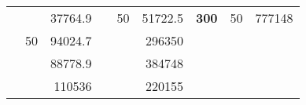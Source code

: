 \begin{table}[H]
\begin{tabular}{|ccrccrccc}
\rowcolor[HTML]{DDFDFF} 
\multicolumn{1}{|c|}{\cellcolor[HTML]{FFFFC7}}                                & \multicolumn{1}{c|}{\cellcolor[HTML]{DDFDFF}}                      & \multicolumn{1}{r|}{\cellcolor[HTML]{DAE8FC}37764.9}   & \multicolumn{1}{c|}{\cellcolor[HTML]{FFFFC7}}                                & \multicolumn{1}{c|}{\multirow{-10}{*}{\cellcolor[HTML]{DDFDFF}50}}  & \multicolumn{1}{r|}{\cellcolor[HTML]{DDFDFF}51722.5}   & \multicolumn{1}{c|}{\multirow{-19}{*}{\cellcolor[HTML]{FFFFC7}\textbf{300}}} & \multicolumn{1}{c|}{\multirow{-10}{*}{\cellcolor[HTML]{DDFDFF}50}} & \multicolumn{1}{r|}{\cellcolor[HTML]{DDFDFF}777148}    \\ \cline{3-3} \cline{5-9} 
\multicolumn{1}{|c|}{\cellcolor[HTML]{FFFFC7}}                                & \multicolumn{1}{c|}{\multirow{-10}{*}{\cellcolor[HTML]{DDFDFF}50}} & \multicolumn{1}{r|}{\cellcolor[HTML]{DDFDFF}94024.7}   & \multicolumn{1}{c|}{\cellcolor[HTML]{FFFFC7}}                                & \multicolumn{1}{c|}{\cellcolor[HTML]{DAE8FC}}                       & \multicolumn{1}{r|}{\cellcolor[HTML]{DAE8FC}296350}    &                                                                              &                                                                    &                                                        \\ \cline{2-3} \cline{6-6}
\multicolumn{1}{|c|}{\cellcolor[HTML]{FFFFC7}}                                & \multicolumn{1}{c|}{\cellcolor[HTML]{DAE8FC}}                      & \multicolumn{1}{r|}{\cellcolor[HTML]{DAE8FC}88778.9}   & \multicolumn{1}{c|}{\cellcolor[HTML]{FFFFC7}}                                & \multicolumn{1}{c|}{\cellcolor[HTML]{DAE8FC}}                       & \multicolumn{1}{r|}{\cellcolor[HTML]{DDFDFF}384748}    &                                                                              &                                                                    &                                                        \\ \cline{3-3} \cline{6-6}
\multicolumn{1}{|c|}{\cellcolor[HTML]{FFFFC7}}                                & \multicolumn{1}{c|}{\cellcolor[HTML]{DAE8FC}}                      & \multicolumn{1}{r|}{\cellcolor[HTML]{DDFDFF}110536}    & \multicolumn{1}{c|}{\cellcolor[HTML]{FFFFC7}}                                & \multicolumn{1}{c|}{\cellcolor[HTML]{DAE8FC}}                       & \multicolumn{1}{r|}{\cellcolor[HTML]{DAE8FC}220155}    &                                                                              &                                                                    &                                                        \\ \cline{3-3} \cline{6-6}

\end{tabular}
\end{table}
